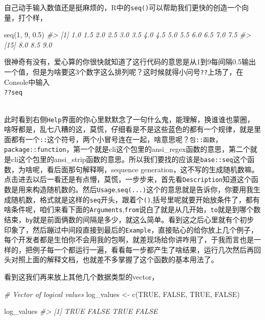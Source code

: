 \documentclass[
]{book}
\newenvironment{Shaded}{\begin{snugshade}}{\end{snugshade}}
\newcommand{\CommentTok}[1]{\textcolor[rgb]{0.56,0.35,0.01}{\textit{#1}}}
\newcommand{\ConstantTok}[1]{\textcolor[rgb]{0.00,0.00,0.00}{#1}}
\newcommand{\DecValTok}[1]{\textcolor[rgb]{0.00,0.00,0.81}{#1}}
\newcommand{\FloatTok}[1]{\textcolor[rgb]{0.00,0.00,0.81}{#1}}
\newcommand{\FunctionTok}[1]{\textcolor[rgb]{0.00,0.00,0.00}{#1}}
\newcommand{\NormalTok}[1]{#1}
\newcommand{\OtherTok}[1]{\textcolor[rgb]{0.56,0.35,0.01}{#1}}
\begin{document}
自己动手输入数值还是挺麻烦的，R中的\texttt{seq()}可以帮助我们更快的创造一个向量，打个样，

\begin{Shaded}
\begin{Highlighting}[]
\FunctionTok{seq}\NormalTok{(}\DecValTok{1}\NormalTok{, }\DecValTok{9}\NormalTok{, }\FloatTok{0.5}\NormalTok{)}
\CommentTok{\#\textgreater{}  [1] 1.0 1.5 2.0 2.5 3.0 3.5 4.0 4.5 5.0 5.5 6.0 6.5 7.0 7.5}
\CommentTok{\#\textgreater{} [15] 8.0 8.5 9.0}
\end{Highlighting}
\end{Shaded}

很神奇有没有，爱心算的你很快就知道了这行代码的意思是从1到9每间隔0.5输出一个值，但是为啥要这3个数字这么排列呢？这时候就得小问号\texttt{??}上场了，在Console中输入\\
\texttt{??seq}\strut \\
此时看到右侧\texttt{Help}界面的你心里默默念了一句什么鬼，能理解，换谁谁也蒙圈，啥呀都是，乱七八糟的这，莫慌，仔细看是不是这些蓝色的都有一个规律，就是里面都有一个\texttt{::}这个符号，两个小冒号连在一起，啥意思呢？\texttt{包::函数}，\texttt{package::function}，第一个就是cli这个包里的ansi\_regex函数的意思，第二个就是cli这个包里的ansi\_strip函数的意思。所以我们要找的应该是\texttt{base::seq}这个函数，为啥呢，看后面那句解释啊，sequence generation，这不写的生成随机数嘛。\\
点击进去以后一看还是有点懵，莫慌，一步步来，首先看\texttt{Description}知道这个函数是用来构造随机数的。然后\texttt{Usage},\texttt{seq(...)}这个的意思就是告诉你，你要用我生成随机数，格式就是这样的\texttt{seq}开头，跟着个\texttt{()},括号里呢就要开始放条件了，都有啥条件呢，咱们来看下面的\texttt{Arguments},\texttt{from}说白了就是从几开始，\texttt{to}就是到哪个数结束，\texttt{by}就是前面俩数的间隔是多少，就这么简单。看到这之后心里就有个初步印象了，然后蹦过中间段直接到最后的\texttt{Example}，直接贴心的给你放上几个例子，每个开发者都是生怕你不会用我的包啊，就差现场给你讲咋用了，于我而言也是一样的，把例子每一个都运行一遍，看看每一步都产生了啥结果，运行几次然后再回头对照上面的解释文档，也就差不多掌握了这个函数的基本用法了。

看到这我们再来放上其他几个数据类型的vector，

\begin{Shaded}
\begin{Highlighting}[]
\CommentTok{\# Vector of logical values}
\NormalTok{log\_values }\OtherTok{\textless{}{-}} \FunctionTok{c}\NormalTok{(}\ConstantTok{TRUE}\NormalTok{, }\ConstantTok{FALSE}\NormalTok{, }\ConstantTok{TRUE}\NormalTok{, }\ConstantTok{FALSE}\NormalTok{)}

\NormalTok{log\_values}
\CommentTok{\#\textgreater{} [1]  TRUE FALSE  TRUE FALSE}
\end{Highlighting}
\end{Shaded}
\end{document}
